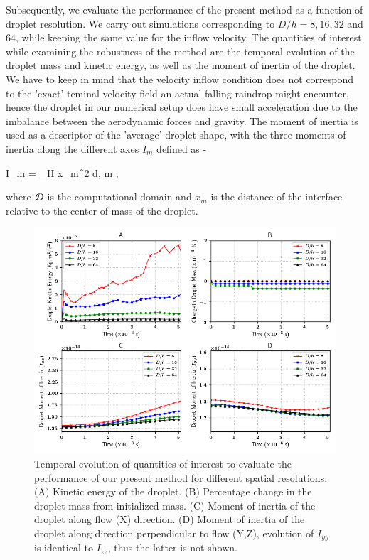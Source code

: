 Subsequently, we evaluate the performance of the present method as a function of droplet resolution. We carry out simulations corresponding to $D/h = 8, 16, 32 $ and $64$, while keeping the same value for the inflow velocity. The quantities of interest while examining the robustness of the method are the temporal evolution of the droplet mass and kinetic energy, as well as the moment of inertia of the droplet. We have to keep in mind that the velocity inflow condition does not correspond to the 'exact' teminal velocity field an actual falling raindrop might encounter, hence the droplet in our numerical setup does have small acceleration due to the imbalance between the aerodynamic forces and gravity. The moment of inertia is used as a descriptor of the 'average' droplet shape, with the three moments of inertia along the different axes $I_m$ defined as - 

\be
I_m = \int_\DDD H x_m^2 {\rm d}\X \;,  \le m ,
\nd

where ${\cal D}$ is the computational domain and $x_m$ is the distance of the interface relative to the center of mass of the droplet.   

\begin{figure}[h!]
\begin{center}
\includegraphics[scale = 0.6]{Figures/Sagar/multiplot_raindrop.png}
\end{center}
\vspace*{-0.5cm}
	\caption{Temporal evolution of quantities of interest to evaluate the performance of our present method for different spatial resolutions. (A) Kinetic energy of the droplet. (B) Percentage change in the droplet mass from initialized mass. (C) Moment of inertia of the droplet along flow (X) direction. (D) Moment of inertia of the droplet along direction perpendicular to flow (Y,Z), evolution of $I_{yy}$ is identical to $I_{zz}$, thus the latter is not shown.}
\label{multi}
\end{figure}


